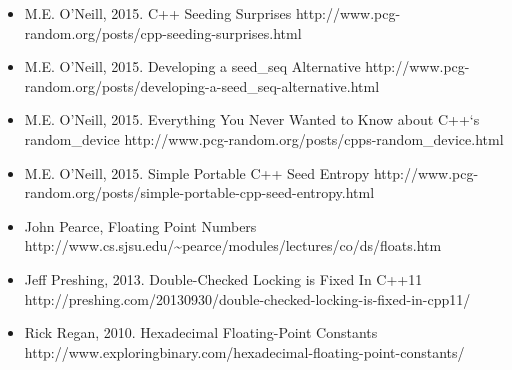 \begin{itemize}

\item M.E. O’Neill, 2015. C++ Seeding Surprises http://\allowbreak{}www.\allowbreak{}pcg-\allowbreak{}random.\allowbreak{}org/\allowbreak{}posts/\allowbreak{}cpp-\allowbreak{}seeding-\allowbreak{}surprises.\allowbreak{}html



\item M.E. O’Neill, 2015. Developing a seed\_seq Alternative http://\allowbreak{}www.\allowbreak{}pcg-\allowbreak{}random.\allowbreak{}org/\allowbreak{}posts/\allowbreak{}developing-\allowbreak{}a-\allowbreak{}seed\_\allowbreak{}seq-\allowbreak{}alternative.\allowbreak{}html



\item M.E. O’Neill, 2015. Everything You Never Wanted to Know about C++‘s random\_device http://\allowbreak{}www.\allowbreak{}pcg-\allowbreak{}random.\allowbreak{}org/\allowbreak{}posts/\allowbreak{}cpps-\allowbreak{}random\_\allowbreak{}device.\allowbreak{}html



\item M.E. O’Neill, 2015. Simple Portable C++ Seed Entropy http://\allowbreak{}www.\allowbreak{}pcg-\allowbreak{}random.\allowbreak{}org/\allowbreak{}posts/\allowbreak{}simple-\allowbreak{}portable-\allowbreak{}cpp-\allowbreak{}seed-\allowbreak{}entropy.\allowbreak{}html



\item John Pearce, Floating Point Numbers http://\allowbreak{}www.\allowbreak{}cs.\allowbreak{}sjsu.\allowbreak{}edu/\textasciitilde{}pearce/modules/lectures/co/ds/floats.htm



\item Jeff Preshing, 2013. Double-Checked Locking is Fixed In C++11 http://\allowbreak{}preshing.\allowbreak{}com/\allowbreak{}20130930/\allowbreak{}double-\allowbreak{}checked-\allowbreak{}locking-\allowbreak{}is-\allowbreak{}fixed-\allowbreak{}in-\allowbreak{}cpp11/



\item Rick Regan, 2010. Hexadecimal Floating-Point Constants http://\allowbreak{}www.\allowbreak{}exploringbinary.\allowbreak{}com/\allowbreak{}hexadecimal-\allowbreak{}floating-\allowbreak{}point-\allowbreak{}constants/



\end{itemize}
